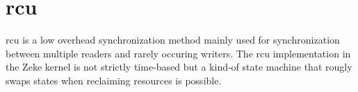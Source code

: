 \chapter{\acf{rcu}}

\acf{rcu} is a low overhead synchronization method mainly used for
synchronization between multiple readers and rarely occuring writers. The
\ac{rcu} implementation in the Zeke kernel is not strictly time-based but a
kind-of state machine that rougly swaps states when reclaiming resources is
possible.
